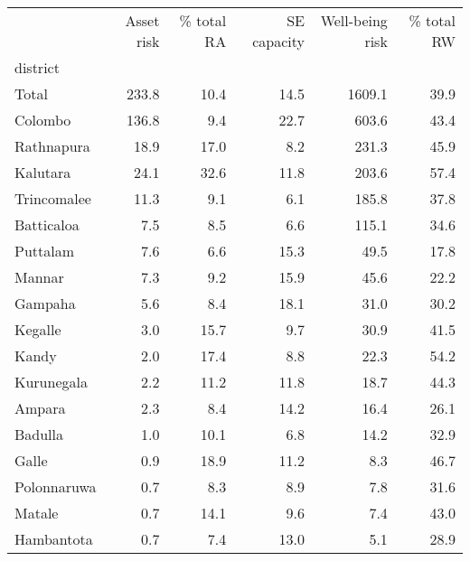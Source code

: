 \begin{tabular}{lrrrrr}
\toprule
{} &  Asset risk &  \% total RA &  SE capacity &  Well-being risk &  \% total RW \\
district     &             &             &              &                  &             \\
\midrule
Total        &       233.8 &        10.4 &         14.5 &           1609.1 &        39.9 \\
Colombo      &       136.8 &         9.4 &         22.7 &            603.6 &        43.4 \\
Rathnapura   &        18.9 &        17.0 &          8.2 &            231.3 &        45.9 \\
Kalutara     &        24.1 &        32.6 &         11.8 &            203.6 &        57.4 \\
Trincomalee  &        11.3 &         9.1 &          6.1 &            185.8 &        37.8 \\
Batticaloa   &         7.5 &         8.5 &          6.6 &            115.1 &        34.6 \\
Puttalam     &         7.6 &         6.6 &         15.3 &             49.5 &        17.8 \\
Mannar       &         7.3 &         9.2 &         15.9 &             45.6 &        22.2 \\
Gampaha      &         5.6 &         8.4 &         18.1 &             31.0 &        30.2 \\
Kegalle      &         3.0 &        15.7 &          9.7 &             30.9 &        41.5 \\
Kandy        &         2.0 &        17.4 &          8.8 &             22.3 &        54.2 \\
Kurunegala   &         2.2 &        11.2 &         11.8 &             18.7 &        44.3 \\
Ampara       &         2.3 &         8.4 &         14.2 &             16.4 &        26.1 \\
Badulla      &         1.0 &        10.1 &          6.8 &             14.2 &        32.9 \\
Galle        &         0.9 &        18.9 &         11.2 &              8.3 &        46.7 \\
Polonnaruwa  &         0.7 &         8.3 &          8.9 &              7.8 &        31.6 \\
Matale       &         0.7 &        14.1 &          9.6 &              7.4 &        43.0 \\
Hambantota   &         0.7 &         7.4 &         13.0 &              5.1 &        28.9 \\

\end{tabular}
